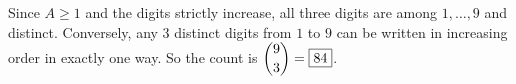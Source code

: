 Since $A\ge1$ and the digits strictly increase, all three digits are among $1,\dots,9$ and distinct. Conversely, any $3$ distinct digits from $1$ to $9$ can be written in increasing order in exactly one way. So the count is $\dbinom93=\boxed{84}$.
